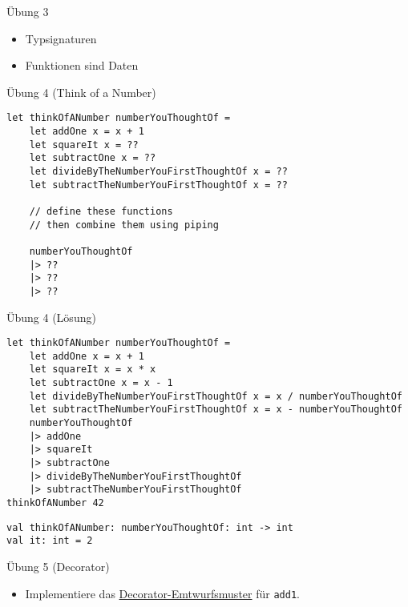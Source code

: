 \documentclass[t]{beamer}
\begin{document}
\begin{frame}[label={sec:orgfa8c698}]{Übung 3}
\begin{itemize}
\item Typsignaturen
\item Funktionen sind Daten
\end{itemize}
\end{frame}

\begin{frame}[label={sec:org0919432},fragile]{Übung 4 (Think of a Number)}
 \begin{verbatim}
let thinkOfANumber numberYouThoughtOf =
    let addOne x = x + 1
    let squareIt x = ??
    let subtractOne x = ??
    let divideByTheNumberYouFirstThoughtOf x = ??
    let subtractTheNumberYouFirstThoughtOf x = ??

    // define these functions
    // then combine them using piping

    numberYouThoughtOf
    |> ??
    |> ??
    |> ??
\end{verbatim}
\end{frame}

\begin{frame}[label={sec:org60e4f88},fragile]{Übung 4 (Lösung)}
 \begin{verbatim}
let thinkOfANumber numberYouThoughtOf =
    let addOne x = x + 1
    let squareIt x = x * x
    let subtractOne x = x - 1
    let divideByTheNumberYouFirstThoughtOf x = x / numberYouThoughtOf
    let subtractTheNumberYouFirstThoughtOf x = x - numberYouThoughtOf
    numberYouThoughtOf
    |> addOne
    |> squareIt
    |> subtractOne
    |> divideByTheNumberYouFirstThoughtOf
    |> subtractTheNumberYouFirstThoughtOf
thinkOfANumber 42
\end{verbatim}

\begin{verbatim}
val thinkOfANumber: numberYouThoughtOf: int -> int
val it: int = 2
\end{verbatim}
\end{frame}

\begin{frame}[label={sec:org0b9f909},fragile]{Übung 5 (Decorator)}
 \begin{itemize}
\item Implementiere das \href{https://de.wikipedia.org/wiki/Decorator}{Decorator-Emtwurfsmuster} für \texttt{add1}.
\end{itemize}
\end{frame}
\end{document}
